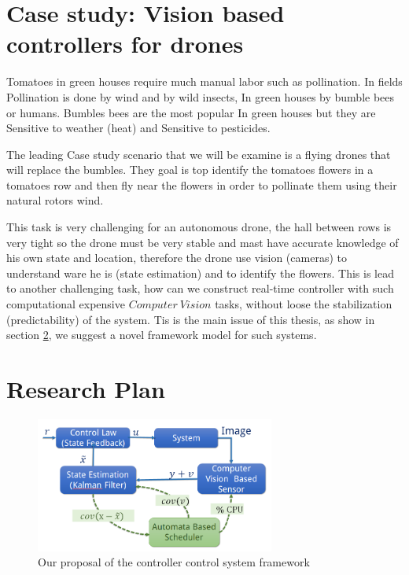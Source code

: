 \documentclass[11pt]{article}
\begin{document}
\section{Case study: Vision based controllers for drones}
\label{sec:Case study}

Tomatoes in green houses require much manual labor such as pollination.
In fields Pollination is done by wind and by wild insects, In green houses by bumble bees or humans. 
Bumbles bees are the most popular In green houses but they are Sensitive to weather (heat) and Sensitive to pesticides.

The leading Case study scenario that we will be examine is a flying drones that will replace the bumbles. 
They goal is top identify the tomatoes flowers in a tomatoes row and then fly near the flowers in order to pollinate them using their natural rotors wind.

This task is very challenging for an autonomous drone, the hall between rows is very tight so the drone must be very stable and mast have accurate knowledge of his own state and location, therefore the drone use vision (cameras) to understand ware he is (state estimation) and to identify the flowers.
This is lead to another challenging task, how can we construct real-time controller with such computational expensive $Computer~Vision$ tasks, without loose the stabilization (predictability) of the system.
Tis is the main issue of this thesis, as show in section \ref{sec:Research Plan}, we suggest a novel framework model for such systems.




\section{Research Plan}
\label{sec:Research Plan}

\begin{figure}[ht]
  \centering
  \includegraphics[width=0.7\textwidth]{hybrid-loop.png}
  \caption{Our proposal of the controller control system framework
  \label{fig:hybrid loop}}
\end{figure}
\end{document}
